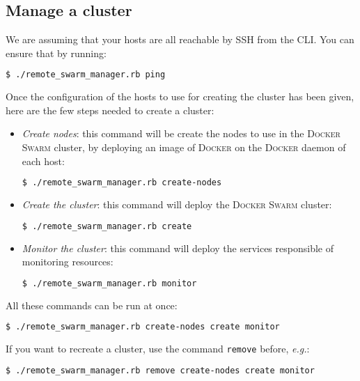 
\subsection{Manage a cluster}
\label{subsec:clustersetup:manage}

We are assuming that your hosts are all reachable by SSH from the CLI.
You can ensure that by running:

\begin{lstlisting}[language=bash, basicstyle=\small]
$ ./remote_swarm_manager.rb ping
\end{lstlisting}

Once the configuration of the hosts to use for creating the cluster has been given, here are the few steps needed to create a cluster:

\begin{itemize}
  \item \emph{Create nodes}: this command will be create the nodes to use in the \textsc{Docker Swarm} cluster, by deploying an image of \textsc{Docker} on the \textsc{Docker} daemon of each host:
    \begin{lstlisting}[language=bash, basicstyle=\small]
  $ ./remote_swarm_manager.rb create-nodes
    \end{lstlisting}
  \item \emph{Create the cluster}: this command will deploy the \textsc{Docker Swarm} cluster:
    \begin{lstlisting}[language=bash, basicstyle=\small]
  $ ./remote_swarm_manager.rb create
    \end{lstlisting}
  \item \emph{Monitor the cluster}: this command will deploy the services responsible of monitoring resources:
    \begin{lstlisting}[language=bash, basicstyle=\small]
  $ ./remote_swarm_manager.rb monitor
    \end{lstlisting}
\end{itemize}

All these commands can be run at once:

\begin{lstlisting}[language=bash, basicstyle=\small]
    $ ./remote_swarm_manager.rb create-nodes create monitor
\end{lstlisting}

If you want to recreate a cluster, use the command \texttt{remove} before, \textit{e.g.}:

\begin{lstlisting}[language=bash, basicstyle=\small]
    $ ./remote_swarm_manager.rb remove create-nodes create monitor
\end{lstlisting}

